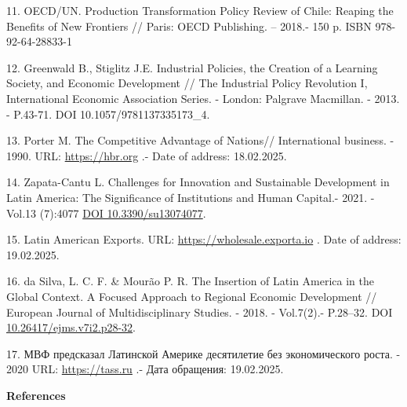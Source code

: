 \begin{references}
11. OECD/UN. Production Transformation Policy Review of Chile: Reaping
the Benefits of New Frontiers // Paris: OECD Publishing. -- 2018.- 150
p. ISBN 978-92-64-28833-1

12. Greenwald B., Stiglitz J.E. Industrial Policies, the Creation of a
Learning Society, and Economic Development // The Industrial Policy
Revolution I, International Economic Association Series. - London:
Palgrave Macmillan. - 2013. - P.43-71. DOI 10.1057/9781137335173\_4.

13. Porter M. The Competitive Advantage of Nations// International
business. - 1990. URL:
\href{https://hbr.org/1990/03/the-competitive-advantage-of-nations}{https://hbr.org} .-
Date of address: 18.02.2025.

14. Zapata-Cantu L. Challenges for Innovation and Sustainable Development
in Latin America: The Significance of Institutions and Human Capital.-
2021. -Vol.13 (7):4077
\href{https://doi.org/10.3390/su13074077}{DOI 10.3390/su13074077}.

15. Latin American Exports. URL:
\href{https://wholesale.exporta.io/blog/latin-american-exports}{https://wholesale.exporta.io} . Date of
address: 19.02.2025.

16. da Silva, L. C. F. \& Mourão P. R. The Insertion of Latin America in
the Global Context. A Focused Approach to Regional Economic Development
// European Journal of Multidisciplinary Studies. - 2018. - Vol.7(2).-
P.28--32. DOI
\href{http://dx.doi.org/10.26417/ejms.v7i2.p28-32}{10.26417/ejms.v7i2.p28-32}.

17. МВФ предсказал Латинской Америке десятилетие без экономического
роста. - 2020 URL: \href{https://tass.ru/ekonomika/8266077}{https://tass.ru} .- Дата
обращения: 19.02.2025.
\end{references}

\begin{center}
{\bfseries References}
\end{center}

